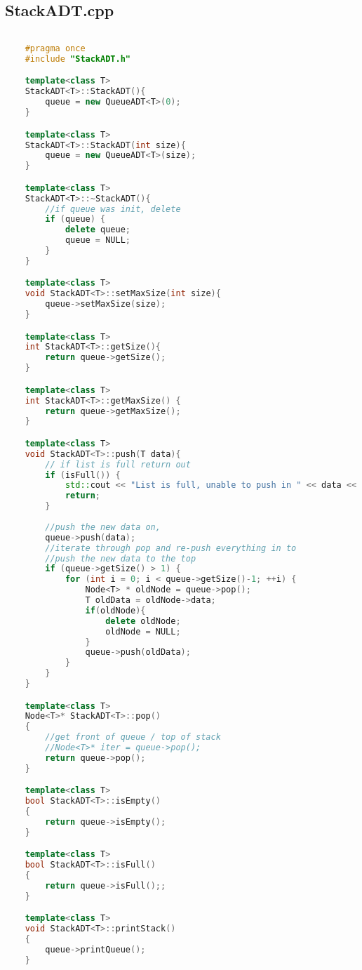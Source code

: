 \documentclass{report}
\begin{document}
\subsection{StackADT.cpp}
\begin{lstlisting}[language=C++]
	
	#pragma once
	#include "StackADT.h"

	template<class T>
	StackADT<T>::StackADT(){
		queue = new QueueADT<T>(0);
	}

	template<class T>
	StackADT<T>::StackADT(int size){
		queue = new QueueADT<T>(size);
	}

	template<class T>
	StackADT<T>::~StackADT(){
		//if queue was init, delete
		if (queue) {
			delete queue;
			queue = NULL;
		}
	}

	template<class T>
	void StackADT<T>::setMaxSize(int size){
		queue->setMaxSize(size);
	}

	template<class T>
	int StackADT<T>::getSize(){
		return queue->getSize();
	}

	template<class T>
	int StackADT<T>::getMaxSize() {
		return queue->getMaxSize();
	}

	template<class T>
	void StackADT<T>::push(T data){
		// if list is full return out
		if (isFull()) {
			std::cout << "List is full, unable to push in " << data << std::endl;
			return;
		}
		
		//push the new data on, 
		queue->push(data);
		//iterate through pop and re-push everything in to 
		//push the new data to the top
		if (queue->getSize() > 1) {
			for (int i = 0; i < queue->getSize()-1; ++i) {
				Node<T> * oldNode = queue->pop();
				T oldData = oldNode->data;	
				if(oldNode){
					delete oldNode;
					oldNode = NULL;
				}		
				queue->push(oldData);
			}
		}
	}

	template<class T>
	Node<T>* StackADT<T>::pop()
	{
		//get front of queue / top of stack
		//Node<T>* iter = queue->pop();
		return queue->pop();
	}

	template<class T>
	bool StackADT<T>::isEmpty()
	{
		return queue->isEmpty();
	}

	template<class T>
	bool StackADT<T>::isFull()
	{
		return queue->isFull();;
	}

	template<class T>
	void StackADT<T>::printStack()
	{
		queue->printQueue();
	}

\end{lstlisting}
\end{document}
